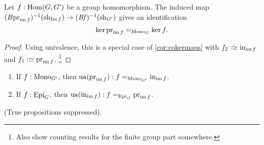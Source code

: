 \begin{lemma}
  \label{lem:kerandcoker}
  \label{lem:countinggps}
  Let $f:\Hom(G,G')$ be a group homomorphism.
  The induced map $(B\prj_{\img f})^{-1}(\sh_{\Img f})\to (\Bf)^{-1}(\sh_{G'})$ gives an identification
  $$\ker\prj_{\img f}=_{\typemono_G} \ker f.$$
\end{lemma}
\begin{proof}
  Using univalence, this is a special case of \cref{cor:cokermaps} with $f_2\defequi\incl_{\img f}$ and $f_1\defequi\prj_{\img f}$.
  \footnote{\color{blue}
 Also show counting results for the finite group part somewhere.}
\end{proof}
\begin{xca}
  \begin{enumerate}
  \item If $f:\mathrm{Mono}_{G'}$, then $\ua(\prj_{\img f}):f=_{\typemono_{G'}}\incl_{\img f}$.
  \item If $f:\mathrm{Epi}_G$, then $\ua(\incl_{\img f}):f=_{\typeepi_{G}}\prj_{\img f}$.
  \end{enumerate}
(True propositions suppressed).
\end{xca}




